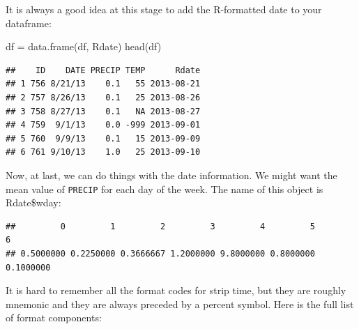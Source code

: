 \documentclass[
]{book}
\newenvironment{Shaded}{\begin{snugshade}}{\end{snugshade}}
\newcommand{\FunctionTok}[1]{\textcolor[rgb]{0.00,0.00,0.00}{#1}}
\newcommand{\NormalTok}[1]{#1}
\newcommand{\OtherTok}[1]{\textcolor[rgb]{0.56,0.35,0.01}{#1}}
\newcommand{\SpecialCharTok}[1]{\textcolor[rgb]{0.00,0.00,0.00}{#1}}
\begin{document}
It is always a good idea at this stage to add the R-formatted date to your dataframe:

\begin{Shaded}
\begin{Highlighting}[]
\NormalTok{df }\OtherTok{=} \FunctionTok{data.frame}\NormalTok{(df, Rdate)}
\FunctionTok{head}\NormalTok{(df)}
\end{Highlighting}
\end{Shaded}

\begin{verbatim}
##    ID    DATE PRECIP TEMP      Rdate
## 1 756 8/21/13    0.1   55 2013-08-21
## 2 757 8/26/13    0.1   25 2013-08-26
## 3 758 8/27/13    0.1   NA 2013-08-27
## 4 759  9/1/13    0.0 -999 2013-09-01
## 5 760  9/9/13    0.1   15 2013-09-09
## 6 761 9/10/13    1.0   25 2013-09-10
\end{verbatim}

Now, at last, we can do things with the date information. We might want the mean value of \texttt{PRECIP} for each day of the week. The name of this object is Rdate\$wday:

\begin{Shaded}
\end{Shaded}

\begin{verbatim}
##         0         1         2         3         4         5         6 
## 0.5000000 0.2250000 0.3666667 1.2000000 9.8000000 0.8000000 0.1000000
\end{verbatim}

It is hard to remember all the format codes for strip time, but they are roughly mnemonic and they are always preceded by a percent symbol. Here is the full list of format components:
\end{document}

